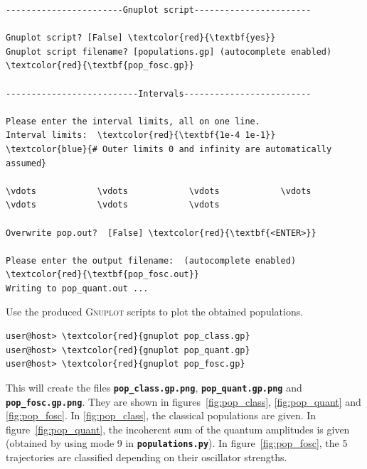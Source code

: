 \documentclass[a4paper,11pt,DIV=15,openany]{scrbook}
\newcommand{\ttt}[1]{\textbf{\texttt{#1}}}
\begin{document}
\begin{oframed}
\begin{Verbatim}[commandchars=\\\{\}]
-----------------------Gnuplot script-----------------------

Gnuplot script? [False] \textcolor{red}{\textbf{yes}}
Gnuplot script filename? [populations.gp] (autocomplete enabled) \textcolor{red}{\textbf{pop_fosc.gp}}

--------------------------Intervals-------------------------

Please enter the interval limits, all on one line.
Interval limits:  \textcolor{red}{\textbf{1e-4 1e-1}}          \textcolor{blue}{# Outer limits 0 and infinity are automatically assumed}

\vdots            \vdots            \vdots            \vdots            \vdots            \vdots            \vdots            

Overwrite pop.out?  [False] \textcolor{red}{\textbf{<ENTER>}}

Please enter the output filename:  (autocomplete enabled) \textcolor{red}{\textbf{pop_fosc.out}}
Writing to pop_quant.out ...
\end{Verbatim}
\end{oframed}

\normalsize
Use the produced \textsc{Gnuplot} scripts to plot the obtained populations.
\begin{Verbatim}[commandchars=\\\{\}]
user@host> \textcolor{red}{gnuplot pop_class.gp}
user@host> \textcolor{red}{gnuplot pop_quant.gp}
user@host> \textcolor{red}{gnuplot pop_fosc.gp}
\end{Verbatim}

This will create the files \ttt{pop\_class.gp.png}, \ttt{pop\_quant.gp.png} and \ttt{pop\_fosc.gp.png}. They are shown in figures~\ref{fig:pop_class}, \ref{fig:pop_quant} and \ref{fig:pop_fosc}. In \ref{fig:pop_class}, the classical populations are given. In figure~\ref{fig:pop_quant}, the incoherent sum of the quantum amplitudes is given (obtained by using mode 9 in \ttt{populations.py}). In figure~\ref{fig:pop_fosc}, the 5 trajectories are classified depending on their oscillator strengths.
\end{document}
